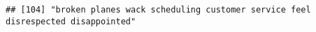 \documentclass[
]{article}
\begin{document}
\begin{verbatim}
## [104] "broken planes wack scheduling customer service feel disrespected disappointed"                                                                                                                                                                                                                                                                                                                                                                                                                                                                                                                                                                                                                                                                                                                                                                                                                                                                                                                                                                                                                                                                                                                                                                                                                                                                                                                                                                                                                                                                                                                                                                                                                                                                                                                 

\end{verbatim}
\end{document}
